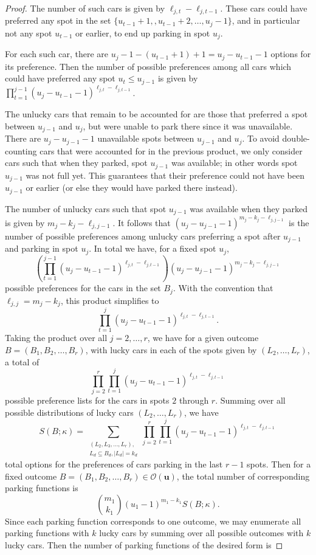\documentclass[reqno]{amsart}
\theoremstyle{definition}
\theoremstyle{remark}
\newcommand{\out}{\mathcal{O}}
\newcommand{\bsy}{\boldsymbol}
\begin{document}
\begin{proof}
The number of such cars is given by $\ell_{j,t}-\ell_{j,t-1}$. These cars could have preferred any spot in the set $\{u_{t-1}+1, ,u_{t-1}+2,\ldots, u_{j}-1\}$, and in particular not any spot $u_{t-1}$ or earlier, to end up parking in spot $u_j$.

For each such car, there are {$u_{j}-1 - (u_{t-1} +1 ) +1 = u_{j} - u_{t-1} -1 $} options for its preference. 
Then the number of possible preferences among all cars which could have preferred any spot $u_t \leq u_{j-1}$ is given by $\prod_{t=1}^{j-1} (u_{j}-u_{t-1}-1)^{\ell_{j,t}-\ell_{j,{t-1}}}$.

The unlucky cars that remain to be accounted for are those that preferred a spot between $u_{j-1}$ and $u_j$, but were unable to park there since it was unavailable.
There are {$u_j-u_{j-1}-1$} unavailable spots between $u_{j-1}$ and $u_j$. To avoid double-counting cars that were accounted for in the previous product, we only consider cars such that when they parked, spot $u_{j-1}$ was available; in other words spot $u_{j-1}$ was not full yet. This guarantees that their preference could not have been $u_{j-1}$ or earlier (or else they would have parked there instead).


The number of unlucky cars such that spot {$u_{j-1}$} was {available} when they parked is given by $m_j-k_j-\ell_{j,j-1}$. 
It follows that $(u_j-u_{j-1}-1)^{m_j-k_j-\ell_{j,j-1}}$ is the number of possible preferences among unlucky cars preferring a spot after $u_{j-1}$ and parking in spot $u_j$.
In total we have, for a fixed spot $u_j$, $$ \left(\prod_{t=1}^{j-1} (u_{j}-u_{t-1}-1)^{\ell_{j,t}-\ell_{j,t-1}}\right)\left(u_j-u_{j-1}-1\right)^{m_j-k_j-\ell_{j,j-1}}$$ possible preferences for the cars in the set $B_j$.
With the convention that $\ell_{j,j} = m_j - k_j$, this product simplifies to
\[ \prod_{t=1}^{j} (u_{j}-u_{t-1}-1)^{\ell_{j,t}-\ell_{j,t-1}}.\] 
Taking the product over all $j=2,\ldots, r$, we have for
a given outcome $B = (B_1,B_2,\ldots, B_r)$,  with lucky cars in each of the spots given by $(L_2,\ldots, L_r)$, a total of
\[ \prod_{j=2}^r \prod_{t=1}^{j} (u_{j}-u_{t-1}-1)^{\ell_{j,t}-\ell_{j,t-1}}\] possible preference lists for the cars in spots $2$ through $r$.
Summing over all possible distributions of lucky cars $(L_2,\ldots, L_r)$, we have 
\[S(B;\kappa) = \sum_{\substack{(L_2,L_3,\ldots,L_r), \\L_d\subseteq B_d, |L_d|=k_d}}\prod_{j=2}^r \prod_{t=1}^{j} (u_{j}-u_{t-1}-1)^{\ell_{j,t}-\ell_{j,t-1}}\]
total options for the preferences of cars parking in the last $r-1$ spots. Then for a fixed outcome $B = (B_1,B_2,\ldots, B_r) \in \out(\bsy u)$, the total number of corresponding parking functions is
\[
\binom{m_1}{k_1}(u_1-1)^{m_1-k_1} S(B ; \kappa).
\]
Since each parking function corresponds to one outcome, we may enumerate all parking functions with $k$ lucky cars by summing over all possible outcomes with $k$ lucky cars. Then the number of parking functions of the desired form is 


\end{proof}
\end{document}
